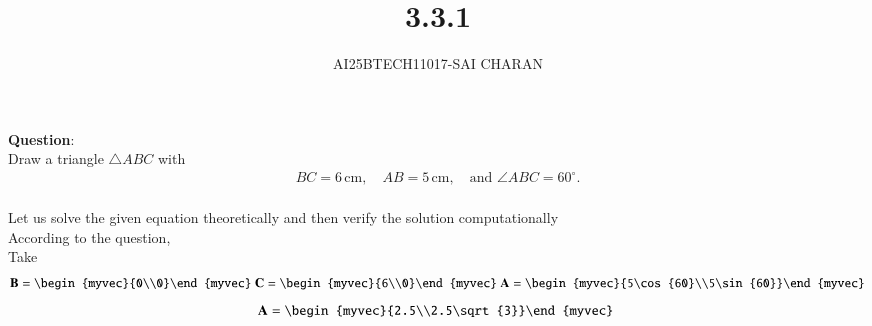 \documentclass[journal]{IEEEtran}
\begin{document}

\vspace{3cm}

\title{3.3.1}
\author{AI25BTECH11017-SAI CHARAN}
 \maketitle
{\let\newpage\relax\maketitle}
\renewcommand{\thefigure}{\theenumi}
\renewcommand{\thetable}{\theenumi}
\setlength{\intextsep}{10pt} %
\renewcommand{\thetable}{\theenumi}
\textbf{Question}:\\
Draw a triangle $\triangle ABC$ with 
\begin{align}
BC = 6 \,\text{cm}, \quad AB = 5 \,\text{cm}, \quad \text{and } \angle ABC = 60^\circ.
\end{align}
\solution \\
Let us solve the given equation theoretically and then verify the solution computationally \\
According to the question, \\
Take\\
\begin{align}
\vec{B}=\begin{myvec}{0\\0}\end{myvec}\
\vec{C}=\begin{myvec}{6\\0}\end{myvec}\
\vec{A}=\begin{myvec}{5\cos{60}\\5\sin{60}}\end{myvec}
\end{align}
   \begin{align}
 \vec{A}=\begin{myvec}{2.5\\2.5\sqrt{3}}\end{myvec}\
\end{align}
\end{document}
